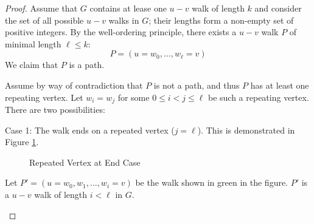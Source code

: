 \begin{proof}
  Assume that \(G\) contains at lease one \(u-v\) walk of length \(k\) and consider the set of all possible \(u-v\)
  walks in \(G\); their lengths form a non-empty set of positive integers.  By the well-ordering principle, there
  exists a \(u-v\) walk \(P\) of minimal length \(\ell\le k\):
  \[P=(u=w_0,\ldots,w_{\ell}=v)\]
  We claim that \(P\) is a path.

  Assume by way of contradiction that \(P\) is not a path, and thus \(P\) has at least one repeating vertex.  Let
  \(w_i=w_j\) for some \(0\le i<j\le\ell\) be such a repeating vertex.  There are two possibilities:
  
  \begin{description}
  \item Case 1: The walk ends on a repeated vertex (\(j=\ell\)).  This is demonstrated in Figure \ref{fig:rend}.

    \begin{figure}[h]
      \label{fig:rend}
      \begin{center}
      \end{center}
      \caption{Repeated Vertex at End Case}
    \end{figure}

    Let \(P'=(u=w_0,w_1,\ldots,w_i=v)\) be the walk shown in green in the figure.  \(P'\) is a \(u-v\) walk of
    length \(i<\ell\) in \(G\).


\end{description}
\end{proof}
